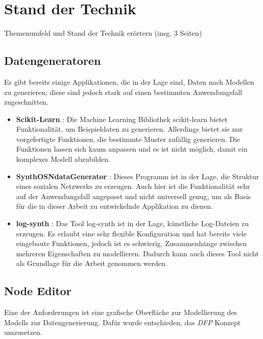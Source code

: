 
\chapter{Stand der Technik}

Themenumfeld und Stand der Technik erörtern (insg. 3 Seiten)

\section{Datengeneratoren}

Es gibt bereits einige Applikationen, die in der Lage sind, Daten nach Modellen zu generieren; diese sind jedoch stark auf einen bestimmten Anwendungsfall zugeschnitten.

\begin{itemize}
    \item \textbf{Scikit-Learn} \cite{scikit-learn:paper, scikit-learn:generator}: Die Machine Learning Bibliothek scikit-learn bietet Funktionalität, um Beispieldaten zu generieren. Allerdings bietet sie nur vorgefertigte Funktionen, die bestimmte Muster zufällig generieren. Die Funktionen lassen sich kaum anpassen und es ist nicht möglich, damit ein komplexes Modell abzubilden.
    \item \textbf{SynthOSNdataGenerator} \cite{synthosndatagenerator}: Dieses Programm ist in der Lage, die Struktur eines sozialen Netzwerks zu erzeugen. Auch hier ist die Funktionalität sehr auf der Anwendungsfall angepasst und nicht universell genug, um als Basis für die in dieser Arbeit zu entwickelnde Applikation zu dienen.
    \item \textbf{log-synth} \cite{logsynth}: Das Tool log-synth ist in der Lage, künstliche Log-Dateien zu erzeugen. Es erlaubt eine sehr flexible Konfiguration und hat bereits viele eingebaute Funktionen, jedoch ist es schwierig, Zusammenhänge zwischen mehreren Eigenschaften zu modellieren. Dadurch kann auch dieses Tool nicht als Grundlage für die Arbeit genommen werden.
\end{itemize}

\section{Node Editor}

Eine der Anforderungen ist eine grafische Oberfläche zur Modellierung des Modells zur Datengenerierung. Dafür wurde entschieden, das \textit{\ac{DFP}} Konzept umzusetzen.

